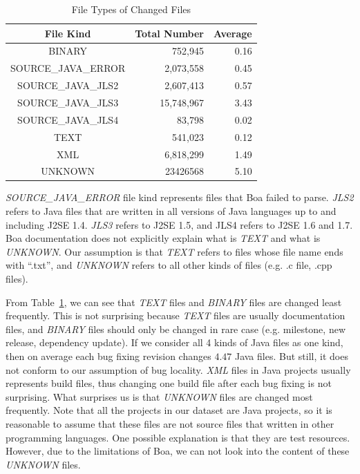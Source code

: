 \documentclass{sig-alternate-05-2015}
\begin{document}
\begin{table}
\centering
  \begin{tabular}{| c | r | r |}
  \hline
  File Kind & Total Number & Average \\ \hline \hline
  BINARY & 752,945 & 0.16 \\ \hline
  SOURCE\_JAVA\_ERROR & 2,073,558 & 0.45 \\ \hline
  SOURCE\_JAVA\_JLS2 & 2,607,413 & 0.57 \\ \hline
  SOURCE\_JAVA\_JLS3 & 15,748,967 & 3.43 \\ \hline
  SOURCE\_JAVA\_JLS4 & 83,798 & 0.02 \\ \hline
  TEXT & 541,023 & 0.12 \\ \hline
  XML & 6,818,299 & 1.49 \\ \hline
  UNKNOWN & 23426568 & 5.10 \\ \hline
  \end{tabular}
  \caption{File Types of Changed Files}
  \label{tbl:fileType}
\end{table}

\emph{SOURCE\_JAVA\_ERROR} file kind represents files that Boa failed to parse.
\emph{JLS2} refers to Java files that are written in all versions of Java
languages up to and including J2SE 1.4. \emph{JLS3} refers to J2SE 1.5, and JLS4
refers to J2SE 1.6 and 1.7. Boa documentation does not explicitly explain what
is \emph{TEXT} and what is \emph{UNKNOWN}. Our assumption is that \emph{TEXT}
refers to files whose file name ends with ``.txt'', and \emph{UNKNOWN} refers to
all other kinds of files (e.g. .c file, .cpp files).

From Table~\ref{tbl:fileType}, we can see that \emph{TEXT} files and
\emph{BINARY} files are changed least frequently. This is not surprising because
\emph{TEXT} files are usually documentation files, and \emph{BINARY} files
should only be changed in rare case (e.g.  milestone, new release, dependency
update). If we consider all 4 kinds of Java files as one kind, then on average
each bug fixing revision changes $4.47$ Java files. But still, it does not
conform to our assumption of bug locality. \emph{XML} files in Java projects
usually represents build files, thus changing one build file after each bug
fixing is not surprising.  What surprises us is that \emph{UNKNOWN} files are
changed most frequently. Note that all the projects in our dataset are Java
projects, so it is reasonable to assume that these files are not source files
that written in other programming languages.  One possible explanation is that
they are test resources. However, due to the limitations of Boa, we can not look
into the content of these \emph{UNKNOWN} files. 
\end{document}
